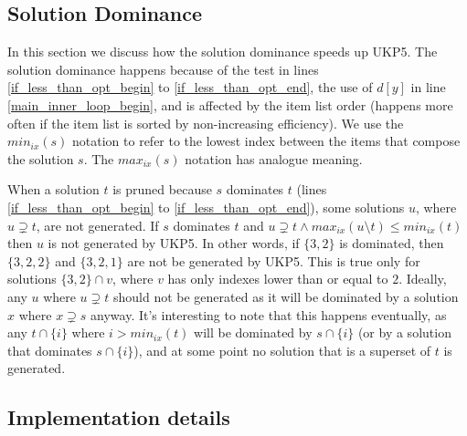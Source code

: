 \documentclass[runningheads,a4paper]{llncs}
\begin{document}
\subsection{Solution Dominance}

In this section we discuss how the solution dominance speeds up UKP5. 
The solution dominance happens because of the test in lines \ref{if_less_than_opt_begin} to \ref{if_less_than_opt_end}, the use of \(d[y]\) in line \ref{main_inner_loop_begin}, and is affected by the item list order (happens more often if the item list is sorted by non-increasing efficiency). 
We use the \(min_{ix}(s)\) notation to refer to the lowest index between the items that compose the solution \(s\). The \(max_{ix}(s)\) notation has analogue meaning.

When a solution \(t\) is pruned because \(s\) dominates \(t\) (lines \ref{if_less_than_opt_begin} to \ref{if_less_than_opt_end}), some solutions \(u\), where \(u \supsetneq t\), are not generated. 
If \(s\) dominates \(t\) and \(u \supsetneq t \land max_{ix}(u\setminus t) \leq min_{ix}(t)\) then \(u\) is not generated by UKP5. 
In other words, if \(\{3, 2\}\) is dominated, then \(\{3, 2, 2\}\) and \(\{3, 2, 1\}\) are not be generated by UKP5. 
This is true only for solutions \(\{3, 2\} \cap v\), where \(v\) has only indexes lower than or equal to \(2\). 
Ideally, any \(u\) where \(u \supsetneq t\) should not be generated as it will be dominated by a solution \(x\) where \(x \supsetneq s\) anyway. 
It's interesting to note that this happens eventually, as any \(t \cap \{i\}\) where \(i > min_{ix}(t)\) will be dominated by \(s \cap \{i\}\) (or by a solution that dominates \(s \cap \{i\}\)), and at some point no solution that is a superset of \(t\) is generated.


\subsection{Implementation details}
\end{document}
